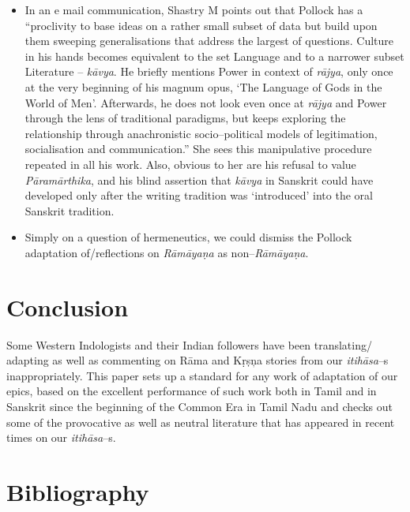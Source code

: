 \begin{itemize}
 \item In an e mail communication, Shastry M points out that Pollock has a “proclivity to base ideas on a rather small subset of data but build upon them sweeping generalisations that address the largest of questions. Culture in his hands becomes equivalent to the set Language and to a narrower subset Literature – \textit{kāvya}. He briefly mentions Power in context of \textit{rājya}, only once at the very beginning of his magnum opus, ‘The Language of Gods in the World of Men’. Afterwards, he does not look even once at \textit{rājya} and Power through the lens of traditional paradigms, but keeps exploring the relationship through anachronistic socio–political models of legitimation, socialisation and communication.” She sees this manipulative procedure repeated in all his work. Also, obvious to her are his refusal to value \textit{Pāramārthika}, and his blind assertion that \textit{kāvya} in Sanskrit could have developed only after the writing tradition was ‘introduced’ into the oral Sanskrit tradition.

 \item Simply on a question of hermeneutics, we could dismiss the Pollock adaptation of/reflections on \textit{Rāmāyaṇa} as non–\textit{Rāmāyaṇa}.

\end{itemize}



\section*{Conclusion}

Some Western Indologists and their Indian followers have been translating/ adapting as well as commenting on Rāma and Kṛṣņa stories from our \textit{itihāsa}–s inappropriately. This paper sets up a standard for any work of adaptation of our epics, based on the excellent performance of such work both in Tamil and in Sanskrit since the beginning of the Common Era in Tamil Nadu and checks out some of the provocative as well as neutral literature that has appeared in recent times on our \textit{itihāsa}–s.


\section*{Bibliography}

